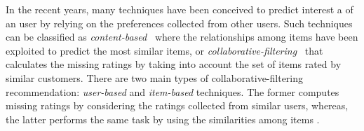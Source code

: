 In the recent years, many techniques have been conceived to predict interest a of an user by relying on the preferences collected from other users. Such techniques can be classified as  \emph{content-based}~\cite{Pazzani2007} where the relationships among items have been exploited to predict the most similar items,
or \emph{collaborative-filtering}~\cite{Miranda:2008:ICF:1486927.1487083} that calculates the missing ratings by taking into account the set of items rated by similar customers. There are two main types of collaborative-filtering recommendation: \emph{user-based} \cite{Zhao:2010:UCR:1748610.1749278} and \emph{item-based} \cite{Sarwar:2001:ICF:371920.372071} techniques. The former computes missing ratings by considering the ratings collected from similar users, whereas, the latter performs the same task by using the similarities among items \cite{Cremonesi:2008:EMC:1468165.1468327}.